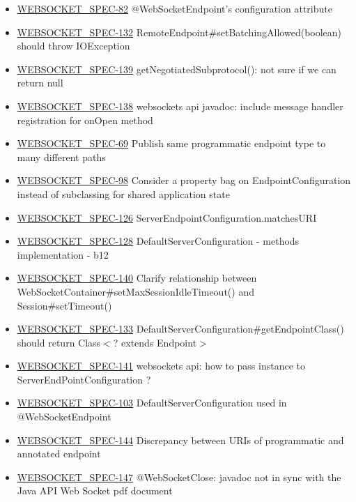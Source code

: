 \begin{itemize}
\item \href {http://java.net/jira/browse/WEBSOCKET_SPEC-82}{WEBSOCKET\_SPEC-82} @WebSocketEndpoint's configuration attribute
\item \href {http://java.net/jira/browse/WEBSOCKET_SPEC-132}{WEBSOCKET\_SPEC-132} RemoteEndpoint\#setBatchingAllowed(boolean) should throw IOException
\item \href {http://java.net/jira/browse/WEBSOCKET_SPEC-139}{WEBSOCKET\_SPEC-139} getNegotiatedSubprotocol(): not sure if we can return null
\item \href {http://java.net/jira/browse/WEBSOCKET_SPEC-138}{WEBSOCKET\_SPEC-138} websockets api javadoc: include message handler registration for onOpen method
\item \href {http://java.net/jira/browse/WEBSOCKET_SPEC-69}{WEBSOCKET\_SPEC-69} Publish same programmatic endpoint type to many different paths
\item \href {http://java.net/jira/browse/WEBSOCKET_SPEC-98}{WEBSOCKET\_SPEC-98} Consider a property bag on EndpointConfiguration instead of subclassing for shared application state
\item \href {http://java.net/jira/browse/WEBSOCKET_SPEC-126}{WEBSOCKET\_SPEC-126} ServerEndpointConfiguration.matchesURI
\item \href {http://java.net/jira/browse/WEBSOCKET_SPEC-128}{WEBSOCKET\_SPEC-128} DefaultServerConfiguration - methods implementation - b12
\item \href {http://java.net/jira/browse/WEBSOCKET_SPEC-140}{WEBSOCKET\_SPEC-140} Clarify relationship between WebSocketContainer\#setMaxSessionIdleTimeout() and Session\#setTimeout()
\item \href {http://java.net/jira/browse/WEBSOCKET_SPEC-133}{WEBSOCKET\_SPEC-133} DefaultServerConfiguration\#getEndpointClass() should return Class$<$? extends Endpoint$>$
\item \href {http://java.net/jira/browse/WEBSOCKET_SPEC-141}{WEBSOCKET\_SPEC-141} websockets api: how to pass instance to ServerEndPointConfiguration ?
\item \href {http://java.net/jira/browse/WEBSOCKET_SPEC-103}{WEBSOCKET\_SPEC-103} DefaultServerConfiguration used in @WebSocketEndpoint
\item \href {http://java.net/jira/browse/WEBSOCKET_SPEC-144}{WEBSOCKET\_SPEC-144} Discrepancy between URIs of programmatic and annotated endpoint 
\item \href {http://java.net/jira/browse/WEBSOCKET_SPEC-147}{WEBSOCKET\_SPEC-147} @WebSocketClose: javadoc not in sync with the Java API Web Socket pdf document

\end{itemize}
